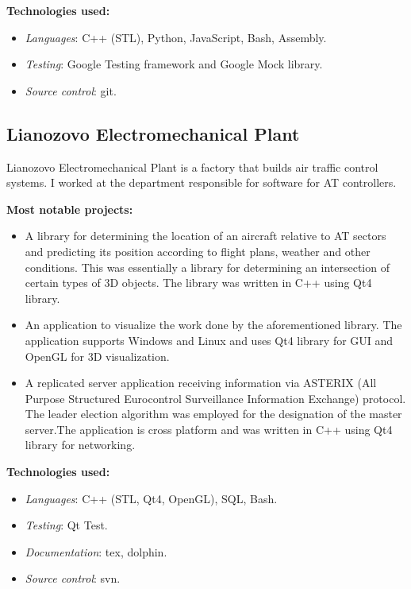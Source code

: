 \documentclass[11pt,a4paper]{moderncv}
\begin{document}
  \medskip
  \textbf{Technologies used:}
  \smallskip
  \begin{itemize}
    \item \textit{Languages}: C++ (STL), Python, JavaScript, Bash, Assembly.
    \item \textit{Testing}: Google Testing framework and Google Mock library.
    \item \textit{Source control}: git.
  \end{itemize}


\bigskip
\subsection{Lianozovo Electromechanical Plant}
  Lianozovo Electromechanical Plant is a factory that builds air traffic control systems. I worked at the department responsible for software for AT controllers.

  \medskip
  \textbf{Most notable projects:}
  \smallskip
  \begin{itemize}
    \item A library for determining the location of an aircraft relative to AT sectors and predicting its position according to flight plans, weather and other conditions.
      This was essentially a library for determining an intersection of certain types of 3D objects. The library was written in C++ using Qt4 library.
    \item An application to visualize the work done by the aforementioned library. The application supports Windows and Linux and uses Qt4 library for GUI and OpenGL for 3D visualization.
    \item A replicated server application receiving information via ASTERIX (All Purpose Structured Eurocontrol Surveillance Information Exchange) protocol.
      The leader election algorithm was employed for the designation of the master server.The application is cross platform and was written in C++ using Qt4 library for networking.
  \end{itemize}

  \medskip
  \textbf{Technologies used:}
  \smallskip
  \begin{itemize}
    \item \textit{Languages}: C++ (STL, Qt4, OpenGL), SQL, Bash.
    \item \textit{Testing}: Qt Test.
    \item \textit{Documentation}: tex, dolphin.
    \item \textit{Source control}: svn.
  \end{itemize}
\end{document}
